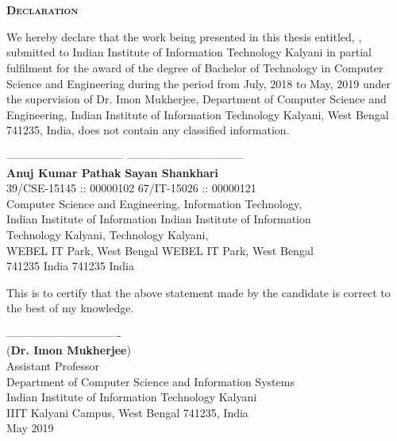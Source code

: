 \newpage
\chapter*{}
\begin{center}
\textbf{\textsc{\Large Declaration}}\\[0.75cm]
\end{center}

\onehalfspacing
We hereby declare that the work being presented in this thesis entitled, \textbf{}, submitted to Indian Institute of Information Technology Kalyani in partial fulfilment for the award of the degree of Bachelor of Technology in Computer Science and Engineering during the period from July, 2018 to May, 2019 under the supervision of Dr. Imon Mukherjee, Department of Computer Science and Engineering, Indian Institute of Information Technology Kalyani, West Bengal 741235, India, does not contain any classified information.

\bigskip
\bigskip
\bigskip
\bigskip

\noindent
-------------------------------- \hfill -------------------------------- \\
\textbf{Anuj Kumar Pathak} \hfill \textbf{Sayan Shankhari} \\
39/CSE-15145 :: 00000102 \hfill 67/IT-15026 :: 00000121 \\
Computer Science and Engineering, \hfill Information Technology, \\
Indian Institute of Information \hfill Indian Institute of Information\\
Technology Kalyani, \hfill Technology Kalyani, \\
WEBEL IT Park, West Bengal \hfill WEBEL IT Park, West Bengal \\
741235 India \hfill 741235 India

\bigskip
\bigskip
\bigskip
This is to certify that the above statement made by the candidate is correct to the best of my knowledge.

\bigskip
\begin{flushleft}
\bigskip
\bigskip
------------------------------- \\
(\textbf{Dr. Imon Mukherjee}) \\
\smallskip
Assistant Professor \\
Department of Computer Science and Information Systems \\
Indian Institute of Information Technology Kalyani \\
IIIT Kalyani Campus, West Bengal 741235, India \\
May 2019 \\
\end{flushleft}
